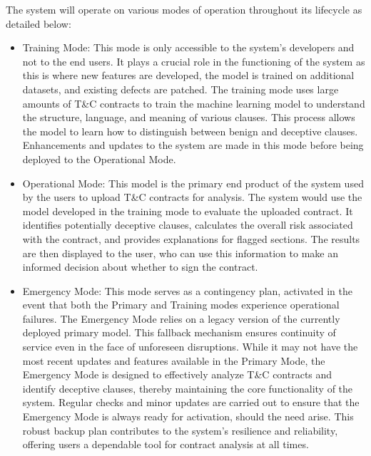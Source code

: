 The system will operate on various modes of operation throughout its lifecycle as detailed below: 
\begin{itemize}
    \item Training Mode: This mode is only accessible to the system's developers and not to the end users. It plays a crucial role in the functioning of the system as this is where new features are developed, the model is trained on additional datasets, and existing defects are patched. The training mode uses large amounts of T\&C contracts to train the machine learning model to understand the structure, language, and meaning of various clauses. This process allows the model to learn how to distinguish between benign and deceptive clauses. Enhancements and updates to the system are made in this mode before being deployed to the Operational Mode. 
    \item Operational Mode: This model is the primary end product of the system used by the users to upload T\&C contracts for analysis. The system would use the model developed in the training mode to evaluate the uploaded contract. It identifies potentially deceptive clauses, calculates the overall risk associated with the contract, and provides explanations for flagged sections. The results are then displayed to the user, who can use this information to make an informed decision about whether to sign the contract.
    \item Emergency Mode: This mode serves as a contingency plan, activated in the event that both the Primary and Training modes experience operational failures. The Emergency Mode relies on a legacy version of the currently deployed primary model. This fallback mechanism ensures continuity of service even in the face of unforeseen disruptions. While it may not have the most recent updates and features available in the Primary Mode, the Emergency Mode is designed to effectively analyze T&C contracts and identify deceptive clauses, thereby maintaining the core functionality of the system. Regular checks and minor updates are carried out to ensure that the Emergency Mode is always ready for activation, should the need arise. This robust backup plan contributes to the system's resilience and reliability, offering users a dependable tool for contract analysis at all times.
    


\end{itemize}


